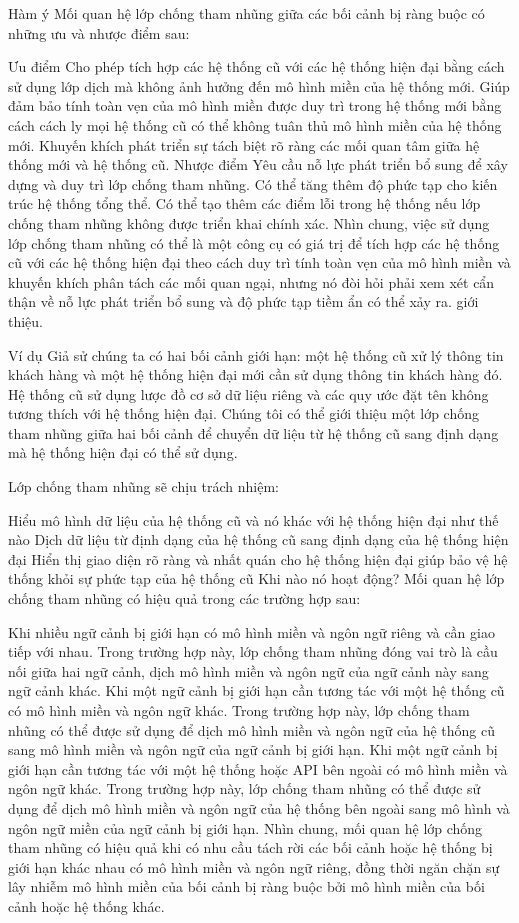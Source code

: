 Hàm ý
Mối quan hệ lớp chống tham nhũng giữa các bối cảnh bị ràng buộc có những ưu và nhược điểm sau:

Ưu điểm
Cho phép tích hợp các hệ thống cũ với các hệ thống hiện đại bằng cách sử dụng lớp dịch mà không ảnh hưởng đến mô hình miền của hệ thống mới.
Giúp đảm bảo tính toàn vẹn của mô hình miền được duy trì trong hệ thống mới bằng cách cách ly mọi hệ thống cũ có thể không tuân thủ mô hình miền của hệ thống mới.
Khuyến khích phát triển sự tách biệt rõ ràng các mối quan tâm giữa hệ thống mới và hệ thống cũ.
Nhược điểm
Yêu cầu nỗ lực phát triển bổ sung để xây dựng và duy trì lớp chống tham nhũng.
Có thể tăng thêm độ phức tạp cho kiến ​​trúc hệ thống tổng thể.
Có thể tạo thêm các điểm lỗi trong hệ thống nếu lớp chống tham nhũng không được triển khai chính xác.
Nhìn chung, việc sử dụng lớp chống tham nhũng có thể là một công cụ có giá trị để tích hợp các hệ thống cũ với các hệ thống hiện đại theo cách duy trì tính toàn vẹn của mô hình miền và khuyến khích phân tách các mối quan ngại, nhưng nó đòi hỏi phải xem xét cẩn thận về nỗ lực phát triển bổ sung và độ phức tạp tiềm ẩn có thể xảy ra. giới thiệu.

Ví dụ
Giả sử chúng ta có hai bối cảnh giới hạn: một hệ thống cũ xử lý thông tin khách hàng và một hệ thống hiện đại mới cần sử dụng thông tin khách hàng đó. Hệ thống cũ sử dụng lược đồ cơ sở dữ liệu riêng và các quy ước đặt tên không tương thích với hệ thống hiện đại. Chúng tôi có thể giới thiệu một lớp chống tham nhũng giữa hai bối cảnh để chuyển dữ liệu từ hệ thống cũ sang định dạng mà hệ thống hiện đại có thể sử dụng.

Lớp chống tham nhũng sẽ chịu trách nhiệm:

Hiểu mô hình dữ liệu của hệ thống cũ và nó khác với hệ thống hiện đại như thế nào
Dịch dữ liệu từ định dạng của hệ thống cũ sang định dạng của hệ thống hiện đại
Hiển thị giao diện rõ ràng và nhất quán cho hệ thống hiện đại giúp bảo vệ hệ thống khỏi sự phức tạp của hệ thống cũ
Khi nào nó hoạt động?
Mối quan hệ lớp chống tham nhũng có hiệu quả trong các trường hợp sau:

Khi nhiều ngữ cảnh bị giới hạn có mô hình miền và ngôn ngữ riêng và cần giao tiếp với nhau. Trong trường hợp này, lớp chống tham nhũng đóng vai trò là cầu nối giữa hai ngữ cảnh, dịch mô hình miền và ngôn ngữ của ngữ cảnh này sang ngữ cảnh khác.
Khi một ngữ cảnh bị giới hạn cần tương tác với một hệ thống cũ có mô hình miền và ngôn ngữ khác. Trong trường hợp này, lớp chống tham nhũng có thể được sử dụng để dịch mô hình miền và ngôn ngữ của hệ thống cũ sang mô hình miền và ngôn ngữ của ngữ cảnh bị giới hạn.
Khi một ngữ cảnh bị giới hạn cần tương tác với một hệ thống hoặc API bên ngoài có mô hình miền và ngôn ngữ khác. Trong trường hợp này, lớp chống tham nhũng có thể được sử dụng để dịch mô hình miền và ngôn ngữ của hệ thống bên ngoài sang mô hình và ngôn ngữ miền của ngữ cảnh bị giới hạn.
Nhìn chung, mối quan hệ lớp chống tham nhũng có hiệu quả khi có nhu cầu tách rời các bối cảnh hoặc hệ thống bị giới hạn khác nhau có mô hình miền và ngôn ngữ riêng, đồng thời ngăn chặn sự lây nhiễm mô hình miền của bối cảnh bị ràng buộc bởi mô hình miền của bối cảnh hoặc hệ thống khác.

